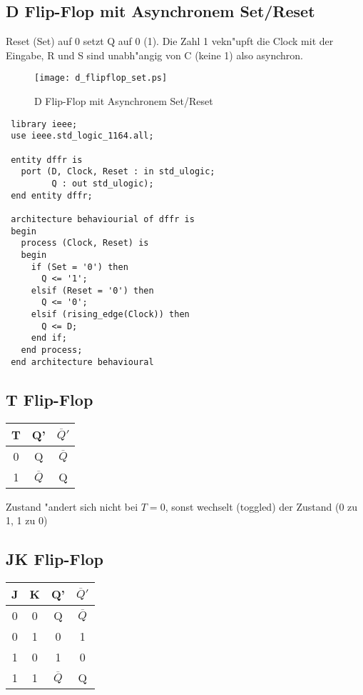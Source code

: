 \documentclass[german, 10pt, a4paper, twocolumn]{scrartcl}
\theoremstyle{definition}
\begin{document}
\subsection{D Flip-Flop mit Asynchronem Set/Reset}

Reset (Set) auf 0 setzt Q auf 0 (1). Die Zahl 1 vekn"upft die Clock mit der Eingabe, R und S sind unabh"angig von C (keine 1) also asynchron.

\begin{figure}[hbt]
 \begin{center}
 	\texttt{[image: d\_flipflop\_set.ps]}
 \end{center}
 \caption{D Flip-Flop mit Asynchronem Set/Reset}
 \label{d_flipflop_set}
\end{figure}

\begin{verbatim}
 library ieee;
 use ieee.std_logic_1164.all;

 entity dffr is
   port (D, Clock, Reset : in std_ulogic;
         Q : out std_ulogic);
 end entity dffr;

 architecture behaviourial of dffr is
 begin
   process (Clock, Reset) is
   begin
     if (Set = '0') then
       Q <= '1';
     elsif (Reset = '0') then   
       Q <= '0';
     elsif (rising_edge(Clock)) then
       Q <= D;
     end if;
   end process;
 end architecture behavioural
\end{verbatim}

\subsection{T Flip-Flop}

\begin{tabular}{c|cc}
	T &	Q'&	$\overline{Q}'$\\ \hline
	0 &	Q &	$\overline{Q}$\\
	1 &	$\overline{Q}$ &	Q
\end{tabular}

Zustand "andert sich nicht bei $T=0$, sonst wechselt (toggled) der Zustand (0 zu 1, 1 zu 0)

\subsection{JK Flip-Flop}

\begin{tabular}{cc|cc}
	J &	K &	Q' &	$\overline{Q}'$\\\hline
	0 &	0 &	Q &	$\overline{Q}$\\
	0 &	1 &	0 &	1\\
	1 &	0 &	1 &	0\\
	1 &	1 &	$\overline{Q}$ &	Q
\end{tabular}
\end{document}
